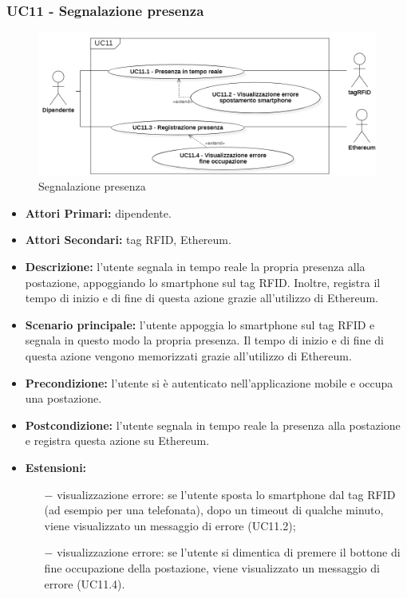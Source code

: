 \subsubsection{ UC11 - Segnalazione presenza}
\begin{figure}[H]
	\centering
	\includegraphics[width=15cm]{res/images/UC11.png}
	\caption{Segnalazione presenza}
	\label{fig:Segnalazione presenza}
\end{figure}
\begin{itemize}
	\item\textbf{Attori Primari:} dipendente.
	\item\textbf{Attori Secondari:} tag RFID, Ethereum.
	\item\textbf{Descrizione:} l’utente segnala in tempo reale la propria presenza alla postazione, appoggiando lo smartphone sul tag RFID. Inoltre, registra il tempo di inizio e di fine di questa azione grazie all'utilizzo di Ethereum.
	\item\textbf{Scenario principale:} l’utente appoggia lo smartphone sul tag RFID e segnala in questo modo la propria presenza.
	Il tempo di inizio e di fine di questa azione vengono memorizzati grazie all'utilizzo di Ethereum.
	\item\textbf{Precondizione:} l’utente si è autenticato nell'applicazione mobile e occupa una postazione.
	\item\textbf{Postcondizione:} l’utente segnala in tempo reale la presenza alla postazione e registra questa azione su Ethereum.
	\item\textbf{Estensioni:} 
	\begin{itemize}
		\item[$-$] visualizzazione errore: se l'utente sposta lo smartphone dal tag RFID (ad esempio per una telefonata), 
		dopo un timeout di qualche minuto, viene visualizzato un messaggio di errore (UC11.2);
		\item[$-$] visualizzazione errore: se l'utente si dimentica di premere il bottone di fine occupazione della postazione, viene visualizzato un messaggio di errore (UC11.4).
	\end{itemize}
\end{itemize}
